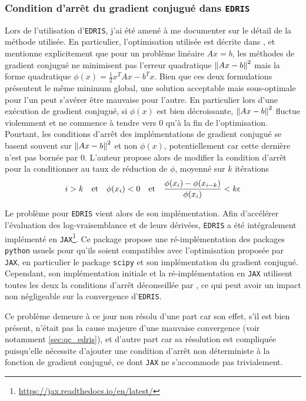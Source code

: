 \documentclass{book}
\def\edris{\texttt{EDRIS}\xspace}
\begin{document}
\subsubsection{Condition d'arrêt du gradient conjugué dans \edris}

Lors de l'utilisation d'\edris, j'ai été amené à me documenter sur le détail de la méthode utilisée. En particulier, l'optimisation utilisée est décrite dans \cite{martens_deep_2010}, et mentionne explicitement que pour un problème linéaire $Ax = b$, les méthodes de gradient conjugué ne minimisent pas l'erreur quadratique $\norm{Ax-b}^2$ mais la forme quadratique $\phi(x) = \frac{1}{2} x^T A x - b^T x$. Bien que ces deux formulations présentent le même minimum global, une solution acceptable mais sous-optimale pour l'un peut s'avérer être mauvaise pour l'autre. En particulier lors d'une exécution de gradient conjugué, si $\phi(x)$ est bien décroissante, $\norm{Ax-b}^2$ fluctue violemment et ne commence à tendre vers 0 qu'à la fin de l'optimisation. Pourtant, les conditions d'arrêt des implémentations de gradient conjugué se basent souvent sur $\norm{Ax-b}^2$ et non $\phi(x)$, potentiellement car cette dernière n'est pas bornée par 0. L'auteur propose alors de modifier la condition d'arrêt pour la conditionner au taux de réduction de $\phi$, moyenné sur $k$ itérations
\begin{equation}
	i > k \qq{et} \phi(x_i) < 0 \qq{et} \frac{\phi(x_i) - \phi(x_{i-k})}{\phi(x_i)} < k \epsilon
\end{equation}

Le problème pour \edris  vient alors de son implémentation. Afin d'accélérer l'évaluation des log-vraisemblance et de leurs dérivées, \edris a été intégralement implémenté en \texttt{JAX}\footnote{\href{https://jax.readthedocs.io/en/latest/}{https://jax.readthedocs.io/en/latest/}}. Ce package propose une ré-implémentation des packages \texttt{python} usuels pour qu'ils soient compatibles avec l'optimisation proposée par \texttt{JAX}, en particulier le package \texttt{scipy} et son implémentation du gradient conjugué. Cependant, son implémentation initiale et la ré-implémentation en \texttt{JAX} utilisent toutes les deux la conditions d'arrêt déconseillée par \cite{martens_deep_2010}, ce qui peut avoir un impact non négligeable sur la convergence d'\edris.

Ce problème demeure à ce jour non résolu d'une part car son effet, s'il est bien présent, n'était pas la cause majeure d'une mauvaise convergence (voir notamment \ref{sec:qc_edris}), et d'autre part car sa résolution est compliquée puisqu'elle nécessite d'ajouter une condition d'arrêt non déterministe à la fonction de gradient conjugué, ce dont \texttt{JAX} ne s’accommode pas trivialement.
\end{document}
